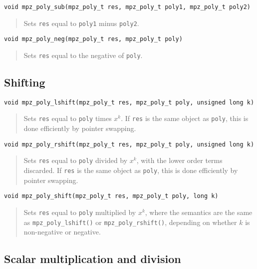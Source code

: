 \documentclass[a4paper,10pt]{article}
\newcommand{\code}{\lstinline}
\begin{document}
\begin{lstlisting}
void mpz_poly_sub(mpz_poly_t res, mpz_poly_t poly1, mpz_poly_t poly2)
\end{lstlisting}
\begin{quote}
Sets \code{res} equal to \code{poly1} minus \code{poly2}.
\end{quote}

\begin{lstlisting}
void mpz_poly_neg(mpz_poly_t res, mpz_poly_t poly)
\end{lstlisting}
\begin{quote}
Sets \code{res} equal to the negative of \code{poly}.
\end{quote}


\subsection{Shifting}

\begin{lstlisting}
void mpz_poly_lshift(mpz_poly_t res, mpz_poly_t poly, unsigned long k)
\end{lstlisting}
\begin{quote}
Sets \code{res} equal to \code{poly} times $x^k$. If \code{res} is the same object as \code{poly}, this is done efficiently by pointer swapping.
\end{quote}

\begin{lstlisting}
void mpz_poly_rshift(mpz_poly_t res, mpz_poly_t poly, unsigned long k)
\end{lstlisting}
\begin{quote}
Sets \code{res} equal to \code{poly} divided by $x^k$, with the lower order terms discarded. If \code{res} is the same object as \code{poly}, this is done efficiently by pointer swapping.
\end{quote}

\begin{lstlisting}
void mpz_poly_shift(mpz_poly_t res, mpz_poly_t poly, long k)
\end{lstlisting}
\begin{quote}
Sets \code{res} equal to \code{poly} multiplied by $x^k$, where the semantics are the same as \code{mpz_poly_lshift()} or \code{mpz_poly_rshift()}, depending on whether $k$ is non-negative or negative.
\end{quote}


\subsection{Scalar multiplication and division}
\end{document}
